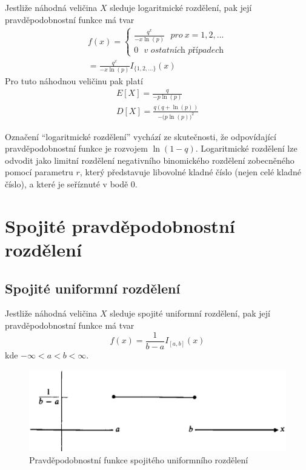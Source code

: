 \begin{definition}
Jestliže náhodná veličina $X$ sleduje logaritmické rozdělení, pak její pravděpodobnostní funkce má tvar
\begin{gather*}
f(x) =
\begin{cases}
\frac{q^x}{-x \ln(p)}~~~\textit{pro}~x = 1, 2, ...\\
0~~~\textit{v ostatních případech}
\end{cases}\\
= \frac{q^x}{-x \ln(p)}I_{\{1, 2, ...\}}(x)
\end{gather*}
Pro tuto náhodnou veličinu pak platí
\begin{gather*}
E[X] = \frac{q}{-p \ln(p)}\\
D[X] = \frac{q(q + \ln(p))}{-\big(p \ln(p) \big)^2}
\end{gather*}
\end{definition}
Označení ``logaritmické rozdělení'' vychází ze skutečnosti, že odpovídající pravděpodobnostní funkce je rozvojem $\ln(1 - q)$. Logaritmické rozdělení lze odvodit jako limitní rozdělení negativního binomického rozdělení zobecněného pomocí parametru $r$, který představuje libovolné kladné číslo (nejen celé kladné číslo), a které je seříznuté v bodě 0.

\section{Spojité pravděpodobnostní rozdělení}

\subsection{Spojité uniformní rozdělení}

\begin{definition}
Jestliže náhodná veličina $X$ sleduje spojité uniformní rozdělení, pak její pravděpodobnostní funkce má tvar
\begin{equation*}
f(x) = \frac{1}{b - a}I_{[a, b]}(x)
\end{equation*}
kde $-\infty < a < b < \infty$.
\end{definition}

\begin{figure}[htp]
\centering
\includegraphics[scale = 0.5]{pictures/continuous_uniform_distribution.eps}
\caption{Pravděpodobnostní funkce spojitého uniformního rozdělení}
\label{continuous_uniform_distribution}
\end{figure}

